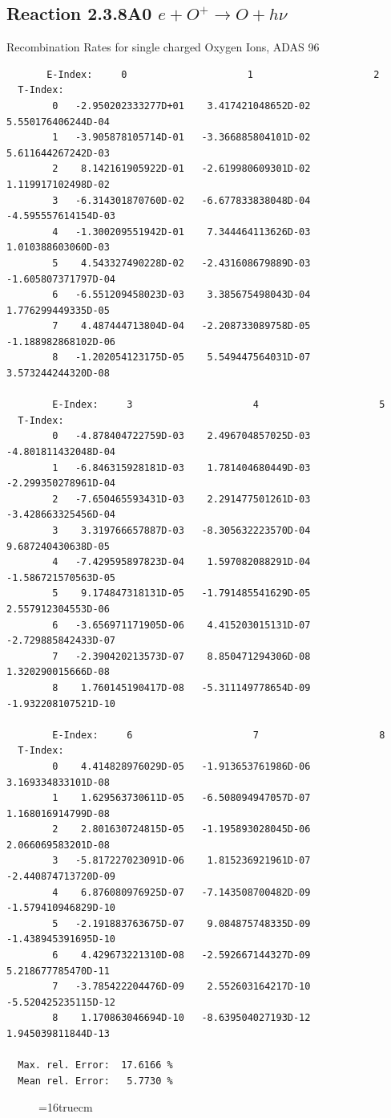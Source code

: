 \documentclass[12pt,dvips]{article}
\begin{document}
\subsection{
Reaction 2.3.8A0  $e + O^{+} \rightarrow O + h\nu$ }
 Recombination Rates for single  charged Oxygen Ions, ADAS 96

\begin{small}\begin{verbatim}
       E-Index:     0                     1                     2
  T-Index:
        0   -2.950202333277D+01    3.417421048652D-02    5.550176406244D-04
        1   -3.905878105714D-01   -3.366885804101D-02    5.611644267242D-03
        2    8.142161905922D-01   -2.619980609301D-02    1.119917102498D-02
        3   -6.314301870760D-02   -6.677833838048D-04   -4.595557614154D-03
        4   -1.300209551942D-01    7.344464113626D-03    1.010388603060D-03
        5    4.543327490228D-02   -2.431608679889D-03   -1.605807371797D-04
        6   -6.551209458023D-03    3.385675498043D-04    1.776299449335D-05
        7    4.487444713804D-04   -2.208733089758D-05   -1.188982868102D-06
        8   -1.202054123175D-05    5.549447564031D-07    3.573244244320D-08

        E-Index:     3                     4                     5
  T-Index:
        0   -4.878404722759D-03    2.496704857025D-03   -4.801811432048D-04
        1   -6.846315928181D-03    1.781404680449D-03   -2.299350278961D-04
        2   -7.650465593431D-03    2.291477501261D-03   -3.428663325456D-04
        3    3.319766657887D-03   -8.305632223570D-04    9.687240430638D-05
        4   -7.429595897823D-04    1.597082088291D-04   -1.586721570563D-05
        5    9.174847318131D-05   -1.791485541629D-05    2.557912304553D-06
        6   -3.656971171905D-06    4.415203015131D-07   -2.729885842433D-07
        7   -2.390420213573D-07    8.850471294306D-08    1.320290015666D-08
        8    1.760145190417D-08   -5.311149778654D-09   -1.932208107521D-10

        E-Index:     6                     7                     8
  T-Index:
        0    4.414828976029D-05   -1.913653761986D-06    3.169334833101D-08
        1    1.629563730611D-05   -6.508094947057D-07    1.168016914799D-08
        2    2.801630724815D-05   -1.195893028045D-06    2.066069583201D-08
        3   -5.817227023091D-06    1.815236921961D-07   -2.440874713720D-09
        4    6.876080976925D-07   -7.143508700482D-09   -1.579410946829D-10
        5   -2.191883763675D-07    9.084875748335D-09   -1.438945391695D-10
        6    4.429673221310D-08   -2.592667144327D-09    5.218677785470D-11
        7   -3.785422204476D-09    2.552603164217D-10   -5.520425235115D-12
        8    1.170863046694D-10   -8.639504027193D-12    1.945039811844D-13

  Max. rel. Error:  17.6166 %
  Mean rel. Error:   5.7730 %

\end{verbatim}\end{small}
\begin{figure} \label{2.3.8A0}
\epsfxsize=16truecm 
\end{figure}
\newpage
\end{document}
